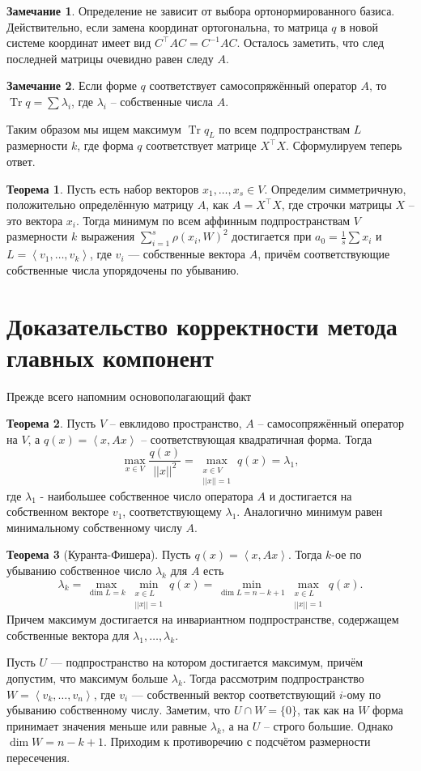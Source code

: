 \documentclass[10pt,a4paper,oneside]{book}
\theoremstyle{definition}
\newtheorem*{rem}{Замечание}
\newtheorem{thm}{Теорема}
\newcommand{\Tr}{\operatorname{Tr}}
\def\lan{\left\langle }
\def\ran{\right\rangle}
\def\thrm{\begin{thm}}
\def\ethrm{\end{thm}}
\def\rm{\begin{rem}}
\def\erm{\end{rem}}
\begin{document}
\rm Определение не зависит от выбора ортонормированного базиса. Действительно, если замена координат ортогональна, то матрица $q$ в новой системе координат имеет вид $C^{\top}AC=C^{-1}AC$. Осталось заметить, что след последней матрицы очевидно равен следу $A$.
\erm

\rm Если форме $q$ соответствует самосопряжённый оператор $A$, то $\Tr q=\sum \lambda_i$, где $\lambda_i$ -- собственные числа $A$.
\erm

Таким образом мы ищем максимум $\Tr q_{L}$ по всем подпространствам $L$ размерности $k$, где форма $q$ соответствует матрице $X^{\top} X$. 
Сформулируем теперь ответ. 


\thrm  Пусть есть набор векторов $x_1,\dots,x_s \in V$. Определим симметричную, положительно определённую матрицу $A$, как $A=X^{\top}X$, где строчки матрицы $X$ -- это вектора $x_i$. Тогда минимум по всем аффинным подпространствам $V$ размерности $k$ выражения $\sum_{i=1}^s \rho(x_i,W)^2$ достигается при $a_0=\frac{1}{s}\sum x_i$  и $L=\lan v_1,\dots,v_k\ran$, где $v_i$ --- собственные вектора $A$, причём соответствующие собственные числа упорядочены по убыванию. 
\ethrm




\section*{Доказательство корректности метода главных компонент}

Прежде всего напомним основополагающий факт 

\thrm Пусть $V$ -- евклидово пространство, $A$ -- самосопряжённый оператор на $V$, а $q(x)=\lan x,Ax\ran$ -- соответствующая квадратичная форма. Тогда 
$$\max_{ x\in V } \frac{q(x)}{||x||^2}=\max_{\substack{ x\in V \\ ||x||=1}} q(x)=\lambda_1,$$
 где $\lambda_1$ - наибольшее собственное число оператора $A$ и достигается на собственном векторе $v_1$, соответствующему $\lambda_1$. Аналогично минимум равен минимальному собственному числу $A$. 
\ethrm


\thrm[Куранта-Фишера] Пусть $q(x)=\lan x, Ax\ran$. Тогда $k$-ое по убыванию собственное число $\lambda_k$ для $A$ есть 
$$ \lambda_k=\max_{\dim L=k} \min_{\substack{ x\in L \\ ||x||=1}} q(x) = \min_{\dim L=n-k+1} \max_{\substack{ x\in L \\ ||x||=1}} q(x).$$
Причем максимум достигается на инвариантном подпространстве, содержащем собственные вектора для $\lambda_1,\dots,\lambda_k$.
\ethrm
\proof Пусть $U$ --- подпространство на котором достигается максимум, причём допустим, что максимум больше $\lambda_k$. Тогда рассмотрим подпространство $W=\lan v_k,\dots,v_n\ran$, где $v_i$ --- собственный вектор соответствующий $i$-ому по убыванию собственному числу. Заметим, что $U\cap W=\{0\}$, так как на $W$ форма принимает значения меньше или равные $\lambda_k$, а на $U$ -- строго большие. Однако $\dim W=n-k+1$. Приходим к противоречию с подсчётом размерности пересечения. 
\endproof
\end{document}
